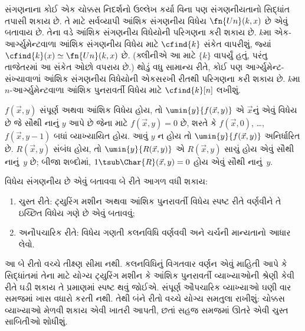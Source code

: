 સંગણનાના કોઈ એક ચોક્કસ નિદર્શનો ઉલ્લેખ કર્યા વિના પણ સંગણનીયતાનો
સિદ્ધાંત તપાસી શકાય છે. તે માટે સર્વવ્યાપી આંશિક સંગણનીય વિધેય
$\fn{Un}(k,x)$ છે એવું બતાવાય છે. તેના વડે આંશિક સંગણનીય વિધેયોની
પરિગણના કરી શકાય છે. $k$મા એક-આર્ગ્યુમેન્ટવાળા આંશિક સંગણનીય
વિધેય માટે $\cfind{k}$ સંકેત વાપરીશું, જ્યાં
$\cfind{k}(x) \simeq \fn{Un}(k,x)$ છે. (ક્લીનીએ આ માટે
$\{ k \}$ વાપર્યું હતું, પરંતુ તાજેતરમાં આ સંકેત ઓછો વપરાય છે.)
થોડું વધુ સામાન્ય રીતે, કોઈ પણ આર્ગ્યુમેન્ટ-સંખ્યાવાળાં આંશિક
સંગણનીય વિધેયોની એકસરખી રીતથી પરિગણના કરી શકાય છે. $k$મા
$n$-આર્ગ્યુમેન્ટવાળા આંશિક પુનરાવર્તી વિધેય માટે
$\cfind{k}[n]$ લખીશું.

$f(\vec x,y)$ સંપૂર્ણ અથવા આંશિક વિધેય હોય, તો
$\umin{y}{f(\vec x,y)}$ એ $\vec x$નું એવું વિધેય છે જે સૌથી નાનું
$y$ આપે છે જેના માટે $f(\vec x,y)=0$ છે, શરતે કે
$f(\vec x,0)$, \dots, $f(\vec x,y-1)$ બધાં વ્યાખ્યાયિત હોય.
આવું $y$ ન હોય તો $\umin{y}{f(\vec x,y)}$ અનિર્ધારિત છે.
$R(\vec x,y)$ સંબંધ હોય, તો $\umin{y}{R(\vec x,y)}$ એ
$R(\vec x,y)$ સાચું હોય એવું સૌથી નાનું~$y$ છે; બીજા શબ્દોમાં,
$1 \tsub \Char{R}(\vec x,y)=0$ હોય એવું સૌથી નાનું~$y$.

વિધેય સંગણનીય છે એવું બતાવવા બે રીતે આગળ વધી શકાય:
\begin{enumerate}
\item ચુસ્ત રીતે: ટ્યુરિંગ મશીન અથવા આંશિક પુનરાવર્તી વિધેય
  સ્પષ્ટ રીતે વર્ણવીને તે ઇચ્છિત વિધેય ગણે છે એવું બતાવવું;
\item અનૌપચારિક રીતે: વિધેય ગણતી કલનવિધિ વર્ણવવી અને ચર્ચની
  માન્યતાનો આધાર લેવો.
\end{enumerate}
આ બે રીતો વચ્ચે તીક્ષ્ણ સીમા નથી. કલનવિધિનું વિગતવાર વર્ણન એવું
માહિતી આપે કે સિદ્ધાંતમાં તેના માટે યોગ્ય ટ્યુરિંગ મશીન કે આંશિક
પુનરાવર્તી વ્યાખ્યાઓની શ્રેણી કેવી રીતે ઘડી શકાય તે પ્રમાણમાં સ્પષ્ટ
થવું જોઈએ. સંપૂર્ણ ઔપચારિક વ્યાખ્યાઓ ઘણી વાર સમજમાં ખાસ વધારો
કરતી નથી. તેથી બંને રીતો વચ્ચે યોગ્ય સમતુલા રાખીશું: ચોક્કસ
વ્યાખ્યાઓ મેળવી શકાય એવી ખાતરી આપતી, છતાં સહજ સમજમાં ઊતરે એવી
ચુસ્ત સાબિતીઓ શોધીશું.
\endgroup


\begingroup
\makeatletter{}\makeatother

\label{guunit:OLP-0230}


